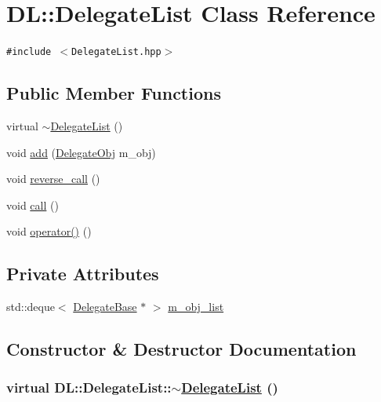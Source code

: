 \hypertarget{classDL_1_1DelegateList}{
\section{DL::Delegate\-List Class Reference}
\label{classDL_1_1DelegateList}
}
{\tt \#include $<$Delegate\-List.hpp$>$}

\subsection*{Public Member Functions}
\begin{CompactItemize}
\item 
virtual \hyperlink{classDL_1_1DelegateList_a0}{$\sim$Delegate\-List} ()
\item 
void \hyperlink{classDL_1_1DelegateList_a1}{add} (\hyperlink{namespaceDL_a0}{Delegate\-Obj} m\_\-obj)
\item 
void \hyperlink{classDL_1_1DelegateList_a2}{reverse\_\-call} ()
\item 
void \hyperlink{classDL_1_1DelegateList_a3}{call} ()
\item 
void \hyperlink{classDL_1_1DelegateList_a4}{operator()} ()
\end{CompactItemize}
\subsection*{Private Attributes}
\begin{CompactItemize}
\item 
std::deque$<$ \hyperlink{classDL_1_1DelegateBase}{Delegate\-Base} $\ast$ $>$ \hyperlink{classDL_1_1DelegateList_r0}{m\_\-obj\_\-list}
\end{CompactItemize}


\subsection{Constructor \& Destructor Documentation}
\hypertarget{classDL_1_1DelegateList_a0}{
\subsubsection[$\sim$DelegateList]{\setlength{\rightskip}{0pt plus 5cm}virtual DL::Delegate\-List::$\sim$\hyperlink{classDL_1_1DelegateList}{Delegate\-List} ()}}
\label{classDL_1_1DelegateList_a0}




